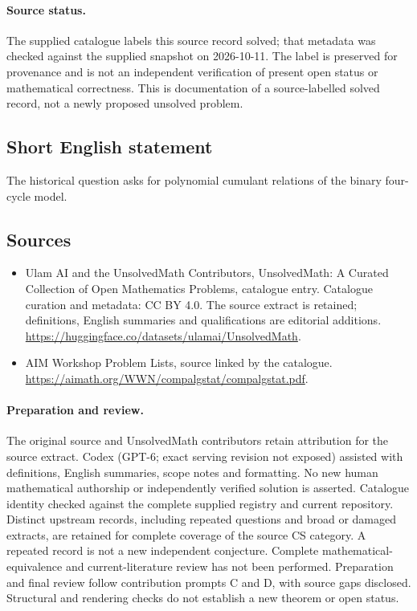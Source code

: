 \documentclass[11pt]{article}
\begin{document}
\paragraph{Source status.}
The supplied catalogue labels this source record solved; that metadata was checked against the supplied snapshot on 2026-10-11. The label is preserved for provenance and is not an independent verification of present open status or mathematical correctness. This is documentation of a source-labelled solved record, not a newly proposed unsolved problem.
\subsection{Short English statement}
The historical question asks for polynomial cumulant relations of the binary four-cycle model.
\subsection{Sources}
\begin{itemize}
\item[\hypertarget{source:statement:1}{S1}] Ulam AI and the UnsolvedMath Contributors, UnsolvedMath: A Curated Collection of Open Mathematics Problems, catalogue entry. Catalogue curation and metadata: CC BY 4.0. The source extract is retained; definitions, English summaries and qualifications are editorial additions.
\url{https://huggingface.co/datasets/ulamai/UnsolvedMath}.
\item[\hypertarget{source:statement:2}{S2}] AIM Workshop Problem Lists, source linked by the catalogue.
\url{https://aimath.org/WWN/compalgstat/compalgstat.pdf}.
\end{itemize}
\paragraph{Preparation and review.}
The original source and UnsolvedMath contributors retain attribution for the source extract. Codex (GPT-6; exact serving revision not exposed) assisted with definitions, English summaries, scope notes and formatting. No new human mathematical authorship or independently verified solution is asserted. Catalogue identity checked against the complete supplied registry and current repository. Distinct upstream records, including repeated questions and broad or damaged extracts, are retained for complete coverage of the source CS category. A repeated record is not a new independent conjecture. Complete mathematical-equivalence and current-literature review has not been performed. Preparation and final review follow contribution prompts C and D, with source gaps disclosed. Structural and rendering checks do not establish a new theorem or open status.
\label{end:statement}
\end{document}
